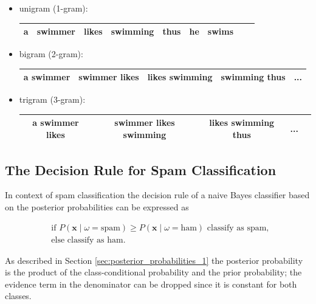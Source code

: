 \documentclass{article}
\begin{document}
\begin{itemize}
\item unigram (1-gram):   

\begin{tabular}{ | c | c | c |  c | c | c | c | c | c | }
\hline
a & swimmer &  likes & swimming & thus & he & swims\\ \hline
\end{tabular}



\item bigram (2-gram):  

\begin{tabular}{ | c | c | c |  c | c | }
\hline
a swimmer & swimmer likes &  likes swimming & swimming thus & ... \\ \hline
\end{tabular}


\item trigram (3-gram):  

\begin{tabular}{ | c | c | c |  c | c | }
\hline
a swimmer likes & swimmer likes swimming &  likes swimming thus &  ... \\ \hline
\end{tabular}

\end{itemize}



\subsection{The Decision Rule for Spam Classification}
\label{sec:decision_rule_spam}

In context of spam classification the decision rule of a naive Bayes classifier based on the posterior probabilities can be expressed as

\begin{equation}
\begin{split} 
    & \text{if } P(\textbf{x} \mid \omega = \text{spam}) \ge P(\textbf{x} \mid \omega = \text{ham})  \text{ classify as spam, }\\
    &  \text{else classify as ham. }
\end{split}
\end{equation}


As described in Section \ref{sec:posterior_probabilities_1} the posterior probability is the product of the class-conditional probability and the prior probability; the evidence term in the denominator can be dropped since it is constant for both classes.
\end{document}
